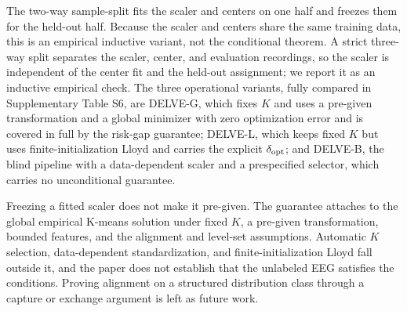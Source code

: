 The two-way sample-split fits the scaler and centers on one half and
freezes them for the held-out half. Because the scaler and centers share
the same training data, this is an empirical inductive variant, not the
conditional theorem. A strict three-way split separates the scaler,
center, and evaluation recordings, so the scaler is independent of the
center fit and the held-out assignment; we report it as an inductive
empirical check. The three operational variants, fully compared in
Supplementary Table S6, are DELVE-G, which fixes \(K\) and uses a
pre-given transformation and a global minimizer with zero optimization
error and is covered in full by the risk-gap guarantee; DELVE-L, which
keeps fixed \(K\) but uses finite-initialization Lloyd and carries the
explicit \(\delta_{\rm opt}\); and DELVE-B, the blind pipeline with a
data-dependent scaler and a prespecified selector, which carries no
unconditional guarantee.

Freezing a fitted scaler does not make it pre-given. The guarantee
attaches to the global empirical K-means solution under fixed \(K\), a
pre-given transformation, bounded features, and the alignment and
level-set assumptions. Automatic \(K\) selection, data-dependent
standardization, and finite-initialization Lloyd fall outside it, and
the paper does not establish that the unlabeled EEG satisfies the
conditions. Proving alignment on a structured distribution class through
a capture or exchange argument is left as future work.
